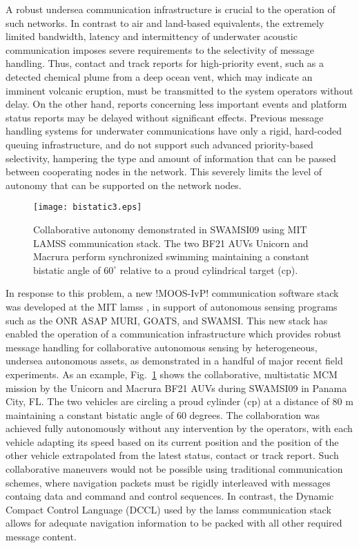 A robust undersea communication infrastructure is crucial to the
operation of such networks. In contrast to air and land-based
equivalents, the extremely limited bandwidth, latency and
intermittency of underwater acoustic communication imposes severe
requirements to the selectivity of message handling. Thus, contact and
track reports for high-priority event, such as a detected chemical
plume from a deep ocean vent,  which may indicate an imminent volcanic
eruption, must be transmitted to the system operators without delay. On the
other hand, reports concerning less important events and platform status 
reports may be delayed without significant effects.
Previous message handling systems for underwater communications have only a
rigid, hard-coded queuing infrastructure, and do not support such
advanced priority-based selectivity, hampering the type and
amount of information that can be passed between cooperating nodes in
the network. This severely limits the level of autonomy that can be
supported on the network nodes.

\begin{figure}[tp]
  \centering 
  \texttt{[image: bistatic3.eps]}
\caption{ Collaborative autonomy demonstrated in SWAMSI09 using MIT
  LAMSS communication stack. The two BF21 AUVs Unicorn and Macrura
  perform synchronized swimming maintaining a constant bistatic angle
  of $60^{\circ}$ relative to a proud cylindrical target
  (cp). \label{bistatic3}}
\end{figure}

In response to this problem, a new !MOOS-IvP! communication software stack was developed at
the MIT \gls{lamss} \cite{lamss}, in
support of autonomous sensing programs such as the ONR ASAP MURI,
GOATS, and SWAMSI. This new stack has enabled the operation of a communication
infrastructure which provides robust message handling for
collaborative autonomous sensing by heterogeneous, undersea autonomous
assets, as demonstrated in a handful of major recent field
experiments. As an example, Fig.~\ref{bistatic3} shows the
collaborative, multistatic MCM mission by the Unicorn and Macrura BF21
AUVs during SWAMSI09 in Panama City, FL. The two vehicles are circling
a proud cylinder (cp) at a distance of 80 m maintaining a constant
bistatic angle of 60 degrees. The collaboration was achieved fully
autonomously without any intervention by the operators, with each
vehicle adapting its speed based on its current position and the
position of the other vehicle extrapolated from the latest status,
contact or track report. Such collaborative maneuvers would not be
possible using traditional communication schemes, where navigation
packets must be rigidly interleaved with messages containg data and
command and control sequences. In contrast, the Dynamic Compact
Control Language (DCCL) used by the \gls{lamss} communication
stack allows for adequate navigation information to be packed with all
other required message content.

